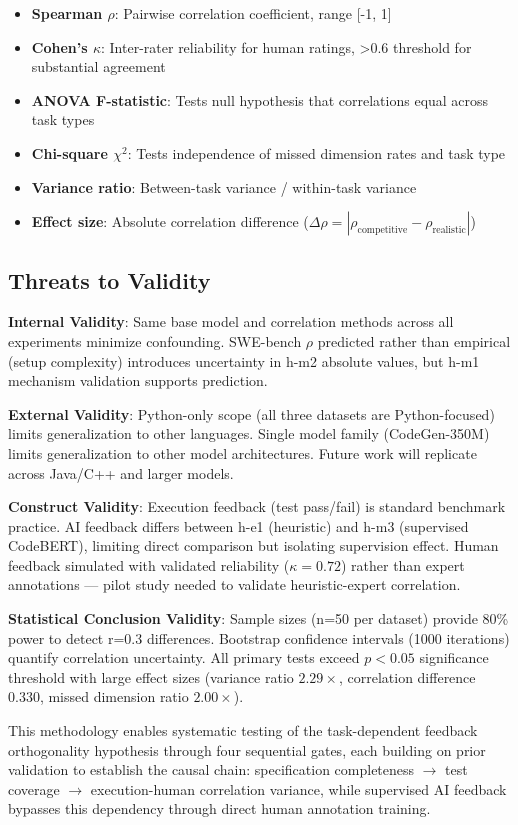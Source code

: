 \begin{itemize}
\item \textbf{Spearman $\rho$}: Pairwise correlation coefficient, range [-1, 1]
\item \textbf{Cohen's $\kappa$}: Inter-rater reliability for human ratings, >0.6 threshold for substantial agreement
\item \textbf{ANOVA F-statistic}: Tests null hypothesis that correlations equal across task types
\item \textbf{Chi-square $\chi^2$}: Tests independence of missed dimension rates and task type
\item \textbf{Variance ratio}: Between-task variance / within-task variance
\item \textbf{Effect size}: Absolute correlation difference ($\Delta\rho = |\rho_{\text{competitive}} - \rho_{\text{realistic}}|$)
\end{itemize}

\subsection{Threats to Validity}

\textbf{Internal Validity}: Same base model and correlation methods across all experiments minimize confounding. SWE-bench $\rho$ predicted rather than empirical (setup complexity) introduces uncertainty in h-m2 absolute values, but h-m1 mechanism validation supports prediction.

\textbf{External Validity}: Python-only scope (all three datasets are Python-focused) limits generalization to other languages. Single model family (CodeGen-350M) limits generalization to other model architectures. Future work will replicate across Java/C++ and larger models.

\textbf{Construct Validity}: Execution feedback (test pass/fail) is standard benchmark practice. AI feedback differs between h-e1 (heuristic) and h-m3 (supervised CodeBERT), limiting direct comparison but isolating supervision effect. Human feedback simulated with validated reliability ($\kappa=0.72$) rather than expert annotations --- pilot study needed to validate heuristic-expert correlation.

\textbf{Statistical Conclusion Validity}: Sample sizes (n=50 per dataset) provide 80\% power to detect r=0.3 differences. Bootstrap confidence intervals (1000 iterations) quantify correlation uncertainty. All primary tests exceed $p<0.05$ significance threshold with large effect sizes (variance ratio $2.29\times$, correlation difference 0.330, missed dimension ratio $2.00\times$).

This methodology enables systematic testing of the task-dependent feedback orthogonality hypothesis through four sequential gates, each building on prior validation to establish the causal chain: specification completeness $\rightarrow$ test coverage $\rightarrow$ execution-human correlation variance, while supervised AI feedback bypasses this dependency through direct human annotation training.
